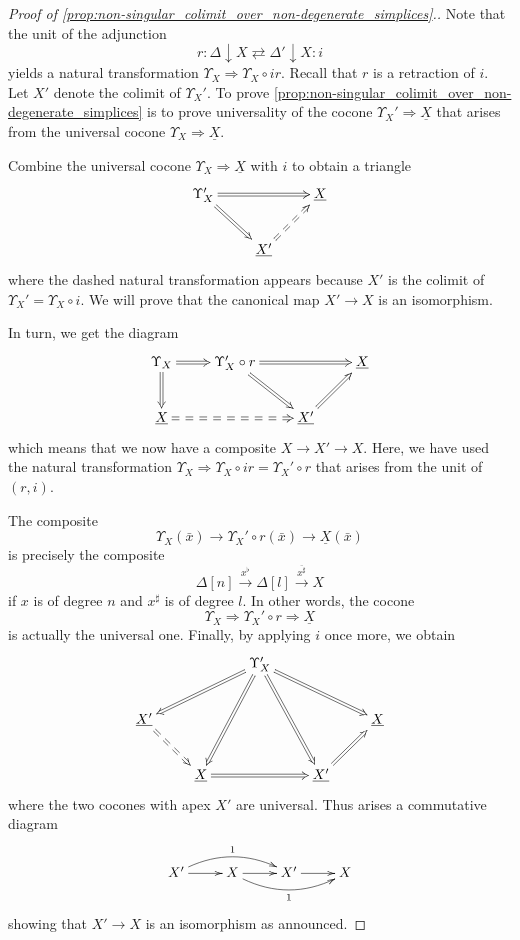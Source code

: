 \begin{proof}[Proof of \cref{prop:non-singular_colimit_over_non-degenerate_simplices}.]
Note that the unit of the adjunction
\[r:\Delta \downarrow X\rightleftarrows \Delta '\downarrow X:i\]
yields a natural transformation $\Upsilon _X\Rightarrow \Upsilon _X\circ ir$. Recall that $r$ is a retraction of $i$. Let $X'$ denote the colimit of $\Upsilon _X'$. To prove \cref{prop:non-singular_colimit_over_non-degenerate_simplices} is to prove universality of the cocone $\Upsilon _X'\Rightarrow \underline{X}$ that arises from the universal cocone $\Upsilon _X\Rightarrow \underline{X}$.

Combine the universal cocone $\Upsilon _X\Rightarrow \underline{X}$ with $i$ to obtain a triangle
\begin{displaymath}
\xymatrix{
\Upsilon _X' \ar@{=>}[dr] \ar@{=>}[rr] && \underline{X} \\
& \underline{X'} \ar@{==>}[ur]
}
\end{displaymath}
where the dashed natural transformation appears because $X'$ is the colimit of $\Upsilon _X'=\Upsilon _X\circ i$. We will prove that the canonical map $X'\to X$ is an isomorphism.

In turn, we get the diagram
\begin{displaymath}
\xymatrix{
\Upsilon _X \ar@{=>}[d] \ar@{=>}[r] & \Upsilon _X'\circ r \ar@{=>}[dr] \ar@{=>}[rr] && \underline{X} \\
\underline{X} \ar@{==>}[rr] && \underline{X'} \ar@{=>}[ur]
}
\end{displaymath}
which means that we now have a composite $X\to X'\to X$. Here, we have used the natural transformation $\Upsilon _X\Rightarrow \Upsilon _X\circ ir=\Upsilon _X'\circ r$ that arises from the unit of $(r,i)$.

The composite
\[\Upsilon _X(\bar{x} )\to \Upsilon _X'\circ r(\bar{x} )\to \underline{X} (\bar{x} )\]
is precisely the composite
\[\Delta [n]\xrightarrow{x^\flat } \Delta [l]\xrightarrow{\overline{x^\sharp } } X\]
if $x$ is of degree $n$ and $x^\sharp$ is of degree $l$. In other words, the cocone
\[\Upsilon _X\Rightarrow \Upsilon _X'\circ r\Rightarrow \underline{X}\]
is actually the universal one. Finally, by applying $i$ once more, we obtain
\begin{displaymath}
\xymatrix{
&& \Upsilon _X' \ar@{=>}[lld] \ar@{=>}[ldd] \ar@{=>}[ddr] \ar@{=>}[drr] \\
\underline{X'} \ar@{==>}[dr] &&&& \underline{X} \\
& \underline{X} \ar@{=>}[rr] && \underline{X'} \ar@{=>}[ur]
}
\end{displaymath}
where the two cocones with apex $X'$ are universal. Thus arises a commutative diagram
\begin{displaymath}
\xymatrix{
X' \ar[r] \ar@/^1pc/[rr]^1 & X \ar[r] \ar@/_1pc/[rr]_1 & X' \ar[r] & X
}
\end{displaymath}
showing that $X'\to X$ is an isomorphism as announced.
\end{proof}

